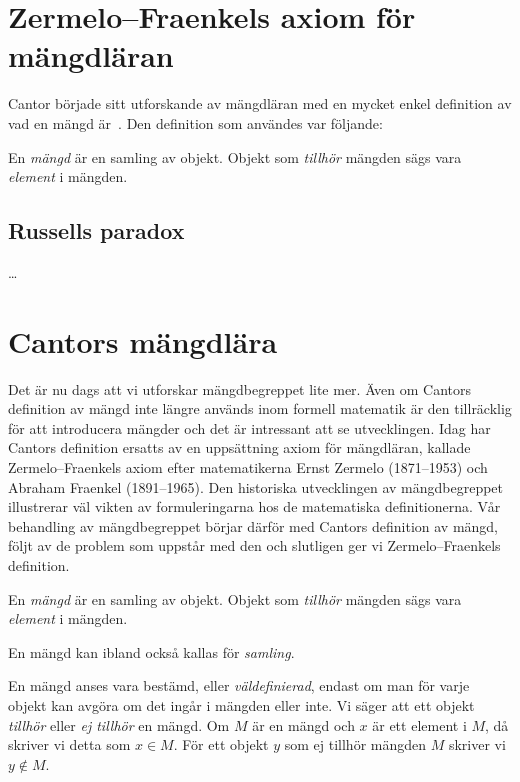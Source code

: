 \section{Zermelo--Fraenkels axiom för mängdläran}%
\label{sec:Zermelo-Fraekel}
Cantor började sitt utforskande av mängdläran med en mycket enkel definition av 
vad en mängd är~\cite{Kline1990mtf3}.
Den definition som användes var följande:
\begin{definition}\label{CantorMangd}
  En \emph{mängd} är en samling av objekt.
  Objekt som \emph{tillhör} mängden sägs vara \emph{element} i mängden.
\end{definition}

\subsection{Russells paradox}%
\label{sec:RusselsParadox}
\dots


\section{Cantors mängdlära}

Det är nu dags att vi utforskar mängdbegreppet lite mer.
Även om Cantors definition av mängd inte längre används inom formell matematik 
är den tillräcklig för att introducera mängder och det är intressant att se 
utvecklingen.
Idag har Cantors definition ersatts av en uppsättning axiom för mängdläran,
kallade Zermelo--Fraenkels axiom efter matematikerna Ernst Zermelo (1871--1953)
och Abraham Fraenkel (1891--1965).
Den historiska utvecklingen av mängdbegreppet illustrerar väl vikten av 
formuleringarna hos de matematiska definitionerna.
Vår behandling av mängdbegreppet börjar därför med Cantors definition av mängd, 
följt av de problem som uppstår med den och slutligen ger vi Zermelo--Fraenkels 
definition.

\begin{definition}\label{CantorMangd}
  En \emph{mängd} är en samling av objekt.
  Objekt som \emph{tillhör} mängden sägs vara \emph{element} i mängden.
\end{definition}
En mängd kan ibland också kallas för \emph{samling}.

En mängd anses vara bestämd, eller \emph{väldefinierad}, endast om man för
varje objekt kan avgöra om det ingår i mängden eller inte.
Vi säger att ett objekt \emph{tillhör} eller \emph{ej tillhör} en mängd.
Om \(M\) är en mängd och \(x\) är ett element i \(M\), då skriver vi detta som
\(x\in M\).
För ett objekt \(y\) som ej tillhör mängden \(M\) skriver vi \(y\notin M\).

